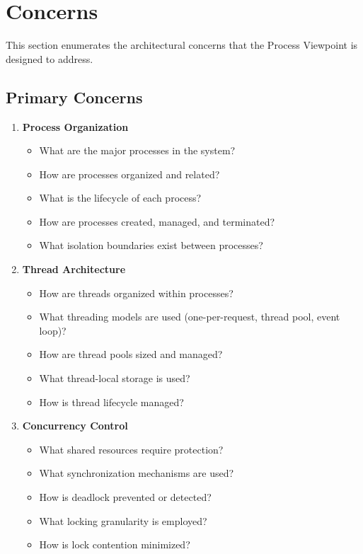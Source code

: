 \documentclass[11pt,letterpaper]{article}
\begin{document}
\section{Concerns}

This section enumerates the architectural concerns that the Process Viewpoint is designed to address.

\subsection{Primary Concerns}

\begin{enumerate}[label=\textbf{C\arabic*:}, leftmargin=2.5em]
    \item \textbf{Process Organization}
    \begin{itemize}[nosep]
        \item What are the major processes in the system?
        \item How are processes organized and related?
        \item What is the lifecycle of each process?
        \item How are processes created, managed, and terminated?
        \item What isolation boundaries exist between processes?
    \end{itemize}
    
    \item \textbf{Thread Architecture}
    \begin{itemize}[nosep]
        \item How are threads organized within processes?
        \item What threading models are used (one-per-request, thread pool, event loop)?
        \item How are thread pools sized and managed?
        \item What thread-local storage is used?
        \item How is thread lifecycle managed?
    \end{itemize}
    
    \item \textbf{Concurrency Control}
    \begin{itemize}[nosep]
        \item What shared resources require protection?
        \item What synchronization mechanisms are used?
        \item How is deadlock prevented or detected?
        \item What locking granularity is employed?
        \item How is lock contention minimized?
    \end{itemize}
    

\end{enumerate}
\end{document}
